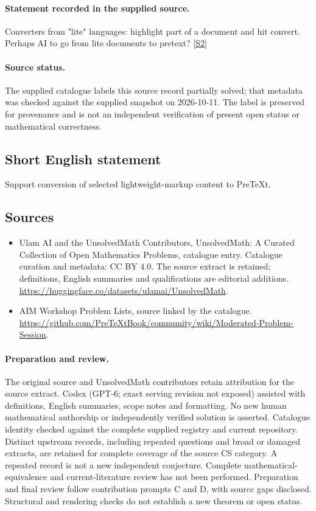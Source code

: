 \documentclass[11pt]{article}
\begin{document}
\paragraph{Statement recorded in the supplied source.}
Converters from "lite" languages: highlight part of a document and hit convert. Perhaps AI to go from lite documents to pretext? \href{https://github.com/PreTeXtBook/community/wiki/Moderated-Problem-Session}{[S2]}
\paragraph{Source status.}
The supplied catalogue labels this source record partially solved; that metadata was checked against the supplied snapshot on 2026-10-11. The label is preserved for provenance and is not an independent verification of present open status or mathematical correctness.
\subsection{Short English statement}
Support conversion of selected lightweight-markup content to PreTeXt.
\subsection{Sources}
\begin{itemize}
\item[S1] Ulam AI and the UnsolvedMath Contributors, UnsolvedMath: A Curated Collection of Open Mathematics Problems, catalogue entry. Catalogue curation and metadata: CC BY 4.0. The source extract is retained; definitions, English summaries and qualifications are editorial additions.
\url{https://huggingface.co/datasets/ulamai/UnsolvedMath}.
\item[S2] AIM Workshop Problem Lists, source linked by the catalogue.
\url{https://github.com/PreTeXtBook/community/wiki/Moderated-Problem-Session}.
\end{itemize}
\paragraph{Preparation and review.}
The original source and UnsolvedMath contributors retain attribution for the source extract. Codex (GPT-6; exact serving revision not exposed) assisted with definitions, English summaries, scope notes and formatting. No new human mathematical authorship or independently verified solution is asserted. Catalogue identity checked against the complete supplied registry and current repository. Distinct upstream records, including repeated questions and broad or damaged extracts, are retained for complete coverage of the source CS category. A repeated record is not a new independent conjecture. Complete mathematical-equivalence and current-literature review has not been performed. Preparation and final review follow contribution prompts C and D, with source gaps disclosed. Structural and rendering checks do not establish a new theorem or open status.
\label{end:statement}
\end{document}
